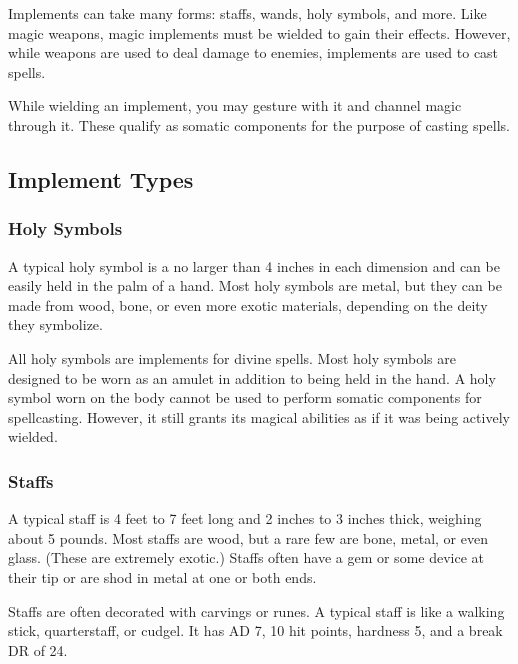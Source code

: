     Implements can take many forms: staffs, wands, holy symbols, and more.
    Like magic weapons, magic implements must be wielded to gain their effects.
    However, while weapons are used to deal damage to enemies, implements are used to cast spells.

     While wielding an implement, you may gesture with it and channel magic through it.
    These qualify as somatic components for the purpose of casting spells.

    \subsection{Implement Types}

        \subsubsection{Holy Symbols}

             A typical holy symbol is a no larger than 4 inches in each dimension and can be easily held in the palm of a hand.
            Most holy symbols are metal, but they can be made from wood, bone, or even more exotic materials, depending on the deity they symbolize.

             All holy symbols are implements for divine spells.
            Most holy symbols are designed to be worn as an amulet in addition to being held in the hand.
            A holy symbol worn on the body cannot be used to perform somatic components for spellcasting.
            However, it still grants its magical abilities as if it was being actively wielded.

        \subsubsection{Staffs}

             A typical staff is 4 feet to 7 feet long and 2 inches to 3 inches thick, weighing about 5 pounds.
            Most staffs are wood, but a rare few are bone, metal, or even glass.
            (These are extremely exotic.)
            Staffs often have a gem or some device at their tip or are shod in metal at one or both ends.

            Staffs are often decorated with carvings or runes.
            A typical staff is like a walking stick, quarterstaff, or cudgel.
            It has AD 7, 10 hit points, hardness 5, and a break DR of 24.

